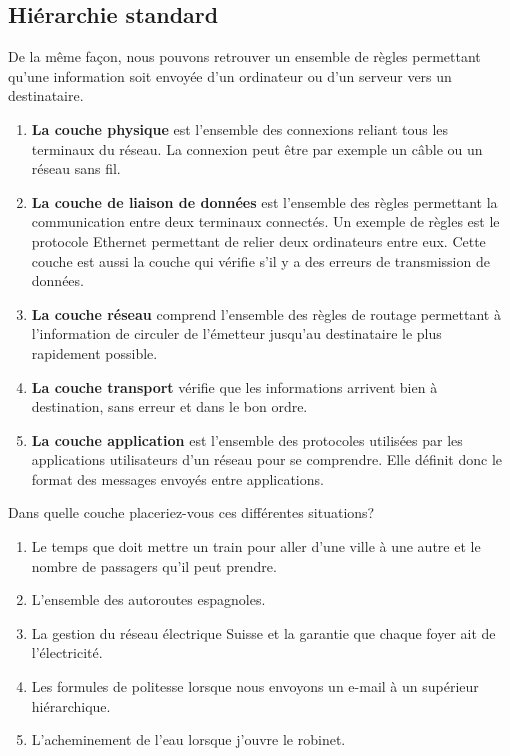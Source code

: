 \documentclass[11pt, a4paper]{book}
\begin{document}
\subsection{Hiérarchie standard}

De la même façon, nous pouvons retrouver un ensemble de règles permettant qu'une information soit envoyée d'un ordinateur ou d'un serveur vers un destinataire. 

\begin{enumerate}
\item {\bf La couche physique} est l'ensemble des connexions reliant tous les terminaux du réseau. La connexion peut être par exemple un câble ou un réseau sans fil.
\item {\bf La couche de liaison de données} est l'ensemble des règles permettant la communication entre deux terminaux connectés. Un exemple de règles est le protocole Ethernet permettant de relier deux ordinateurs entre eux. Cette couche est aussi la couche qui vérifie s'il y a des erreurs de transmission de données. 

\item {\bf La couche réseau} comprend l'ensemble des règles de routage permettant à l'information de circuler de l'émetteur jusqu'au destinataire le plus rapidement possible.

\item {\bf La couche transport} vérifie que les informations arrivent bien à destination, sans erreur et dans le bon ordre.

\item {\bf La couche application} est l'ensemble des protocoles utilisées par les applications utilisateurs d'un réseau pour se comprendre. Elle définit donc le format des messages envoyés entre applications. 


\end{enumerate}

\begin{exercice}
Dans quelle couche placeriez-vous ces différentes situations?
\begin{enumerate}
\item Le temps que doit mettre un train pour aller d'une ville à une autre et le nombre de passagers qu'il peut prendre.
\item L'ensemble des autoroutes espagnoles.
\item La gestion du réseau électrique Suisse et la garantie que chaque foyer ait de l'électricité.
\item Les formules de politesse lorsque nous envoyons un e-mail à un supérieur hiérarchique.
\item L'acheminement de l'eau lorsque j'ouvre le robinet.

\end{enumerate}
\end{exercice}
\end{document}
